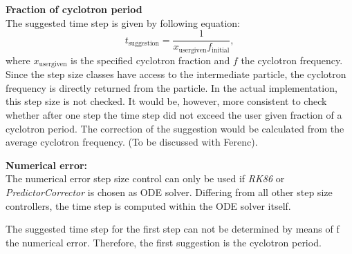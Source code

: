         \textbf{Fraction of cyclotron period}\\
        The suggested time step is given by following equation:
        \begin{equation}
            t_{\mathrm{suggestion}} = \frac{1}{x_{\mathrm{usergiven}} f_{\mathrm{initial}}},
        \end{equation}
        where $x_{\mathrm{usergiven}}$ is the specified cyclotron fraction and $f$ the cyclotron frequency.
        Since the step size classes have access to the intermediate particle, the cyclotron frequency is directly returned from the particle.
        In the actual implementation, this step size is not checked. It would be, however, more consistent to check whether after one step the time step did not exceed the user given fraction of a cyclotron period. The correction of the suggestion would be calculated from the average cyclotron frequency. (To be discussed with Ferenc).
        
        \textbf{Numerical error:}\\
        The numerical error step size control can only be used if \textit{RK86} or \textit{PredictorCorrector} is chosen as ODE solver. Differing from all other step size controllers, the time step is computed within the ODE solver itself. 
        
         The suggested time step for the first step can not be determined by means of f the numerical error. Therefore, the first suggestion is the cyclotron period. 
        
